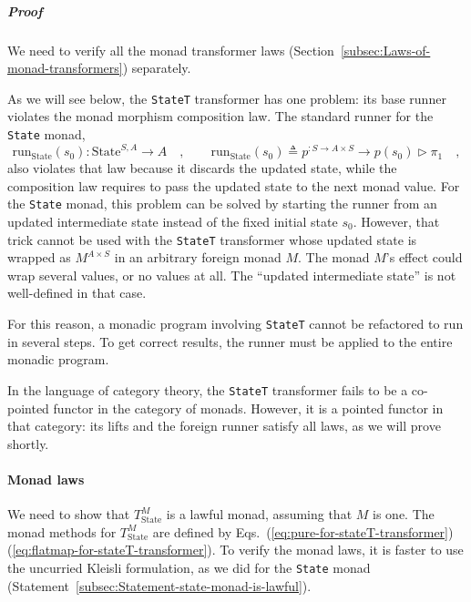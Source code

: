 \subparagraph{Proof}

We need to verify all the monad transformer laws (Section~\ref{subsec:Laws-of-monad-transformers})
separately.

As we will see below, the \lstinline!StateT! transformer has one
problem: its base runner violates the monad morphism composition law.
The standard runner for the \lstinline!State! monad,
\[
\text{run}_{\text{State}}(s_{0}):\text{State}^{S,A}\rightarrow A\quad,\quad\quad\text{run}_{\text{State}}(s_{0})\triangleq p^{:S\rightarrow A\times S}\rightarrow p(s_{0})\triangleright\pi_{1}\quad,
\]
also violates that law because it discards the updated state, while
the composition law requires to pass the updated state to the next
monad value. For the \lstinline!State! monad, this problem can be
solved by starting the runner from an updated intermediate state instead
of the fixed initial state $s_{0}$. However, that trick cannot be
used with the \lstinline!StateT! transformer whose updated state
is wrapped as $M^{A\times S}$ in an arbitrary foreign monad $M$.
The monad $M$\textsf{'}s effect could wrap several values, or no values at
all. The \textsf{``}updated intermediate state\textsf{''} is not well-defined in that
case.

For this reason, a monadic program involving \lstinline!StateT! cannot
be refactored to run in several steps. To get correct results, the
runner must be applied to the entire monadic program.

In the language of category theory, the \lstinline!StateT! transformer
fails to be a co-pointed functor in the category of monads. However,
it is a pointed functor in that category: its lifts and the foreign
runner satisfy all laws, as we will prove shortly.

\paragraph{Monad laws}

We need to show that $T_{\text{State}}^{M}$ is a lawful monad, assuming
that $M$ is one. The monad methods for $T_{\text{State}}^{M}$ are
defined by Eqs.~(\ref{eq:pure-for-stateT-transformer})\textendash (\ref{eq:flatmap-for-stateT-transformer}).
To verify the monad laws, it is faster to use the uncurried Kleisli
formulation, as we did for the \lstinline!State! monad (Statement~\ref{subsec:Statement-state-monad-is-lawful}). 

